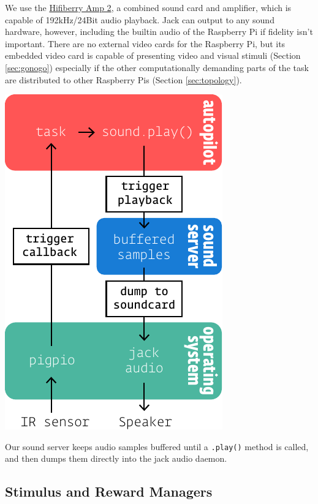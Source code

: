 \documentclass[nohyper, justified, notitlepage, marginals=raggedright,twoside=false,debug]{tufte-autopilot}
\begin{document}
We use the \href{https://www.hifiberry.com/shop/boards/hifiberry-amp2/}{Hifiberry Amp 2}, a combined sound card and amplifier, which is capable of 192kHz/24Bit audio playback. Jack can output to any sound hardware, however, including the builtin audio of the Raspberry Pi if fidelity isn't important. There are no external video cards for the Raspberry Pi, but its embedded video card is capable of presenting video and visual stimuli (Section \ref{sec:gonogo}) especially if the other computationally demanding parts of the task are distributed to other Raspberry Pis (Section \ref{sec:topology}).

\begin{marginfigure}[0cm]
\includegraphics[]{figures/side_19_soundpath.pdf}
\caption{Our sound server keeps audio samples buffered until a \texttt{.play()} method is called, and then dumps them directly into the jack audio daemon.}
\label{fig:soundpath}
\end{marginfigure}

\subsection{Stimulus and Reward Managers}
\label{sec:managers}
\end{document}
